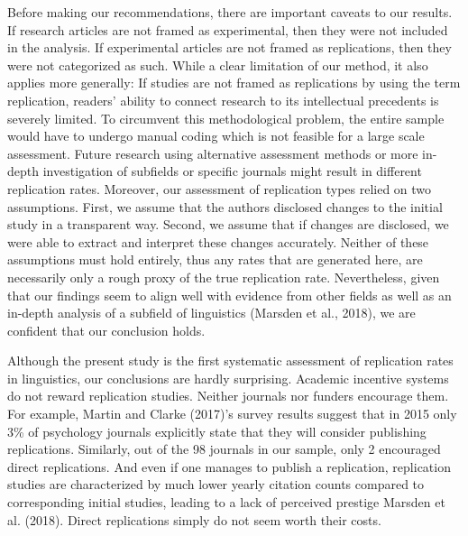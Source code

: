 \documentclass[]{elsarticle} %
\begin{document}
Before making our recommendations, there are important caveats to our results. If research articles are not framed as experimental, then they were not included in the analysis. If experimental articles are not framed as replications, then they were not categorized as such. While a clear limitation of our method, it also applies more generally: If studies are not framed as replications by using the term replication, readers' ability to connect research to its intellectual precedents is severely limited. To circumvent this methodological problem, the entire sample would have to undergo manual coding which is not feasible for a large scale assessment. Future research using alternative assessment methods or more in-depth investigation of subfields or specific journals might result in different replication rates.
Moreover, our assessment of replication types relied on two assumptions. First, we assume that the authors disclosed changes to the initial study in a transparent way. Second, we assume that if changes are disclosed, we were able to extract and interpret these changes accurately. Neither of these assumptions must hold entirely, thus any rates that are generated here, are necessarily only a rough proxy of the true replication rate. Nevertheless, given that our findings seem to align well with evidence from other fields as well as an in-depth analysis of a subfield of linguistics (Marsden et al., 2018), we are confident that our conclusion holds.

Although the present study is the first systematic assessment of replication rates in linguistics, our conclusions are hardly surprising. Academic incentive systems do not reward replication studies. Neither journals nor funders encourage them. For example, Martin and Clarke (2017)'s survey results suggest that in 2015 only 3\% of psychology journals explicitly state that they will consider publishing replications. Similarly, out of the 98 journals in our sample, only 2 encouraged direct replications. And even if one manages to publish a replication, replication studies are characterized by much lower yearly citation counts compared to corresponding initial studies, leading to a lack of perceived prestige Marsden et al. (2018). Direct replications simply do not seem worth their costs.
\end{document}
